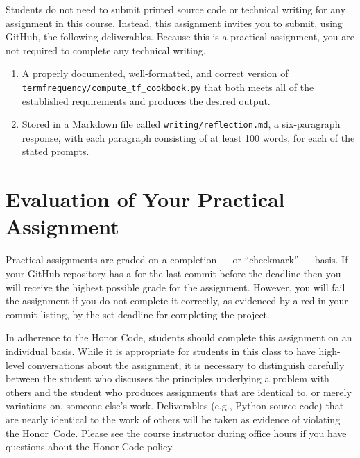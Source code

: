 \documentclass[11pt]{article}
\newcommand{\mainprogramsource}{\lstinline{termfrequency/compute_tf_cookbook.py}}
\newcommand{\reflection}{\lstinline{writing/reflection.md}}
\newcommand{\checkmark}{\ding{51}}
\newcommand{\naughtmark}{\ding{55}}
\begin{document}
\noindent Students do not need to submit printed source code or technical
writing for any assignment in this course. Instead, this assignment invites you
to submit, using GitHub, the following deliverables. Because this is a practical
assignment, you are not required to complete any technical writing.

\begin{enumerate}

\setlength{\itemsep}{0in}

\item A properly documented, well-formatted, and correct version of
  \mainprogramsource{} that both meets all of the established requirements and
  produces the desired output.

\item Stored in a Markdown file called \reflection{}, a six-paragraph response,
  with each paragraph consisting of at least 100 words, for each of the stated
  prompts.

\end{enumerate}

\section*{Evaluation of Your Practical Assignment}

Practical assignments are graded on a completion --- or ``checkmark'' --- basis. If
your GitHub repository has a \checkmark{} for the last commit before the
deadline then you will receive the highest possible grade for the assignment.
However, you will fail the assignment if you do not complete it correctly, as
evidenced by a red \naughtmark{} in your commit listing, by the set deadline for
completing the project.

In adherence to the Honor Code, students should complete this assignment on an
individual basis. While it is appropriate for students in this class to have
high-level conversations about the assignment, it is necessary to distinguish
carefully between the student who discusses the principles underlying a problem
with others and the student who produces assignments that are identical to, or
merely variations on, someone else's work. Deliverables (e.g., Python source
code) that are nearly identical to the work of others will be taken as evidence
of violating the \mbox{Honor Code}. Please see the course instructor during
office hours if you have questions about the Honor Code policy.
\end{document}
